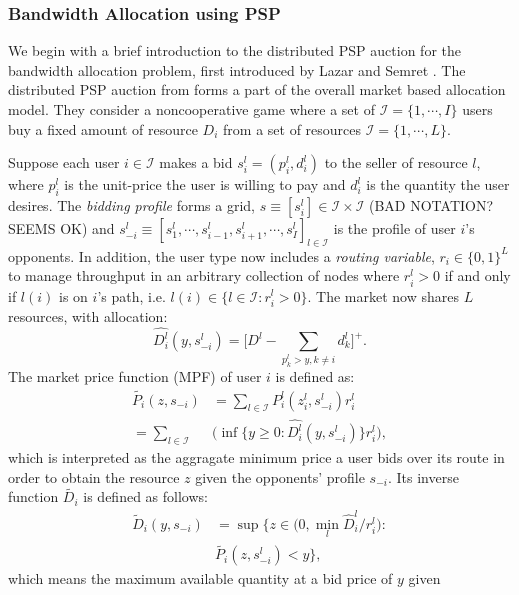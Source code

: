 \documentclass[12pt]{article}
\theoremstyle{definition}
\newcommand{\mcI}{\mathcal{I}}
\begin{document}
\begin{multicols}{2}
\subsubsection{Bandwidth Allocation using PSP}

We begin with a brief introduction to the distributed PSP auction for the
bandwidth allocation problem, first introduced by Lazar and Semret \cite{lazar}.
The distributed PSP auction from \cite{lazar} forms a part of the
overall market based allocation model. They consider a noncooperative game
where a set of $\mcI = \lbrace 1,\cdots,I\rbrace$ users buy a fixed
amount of resource $D_i$ from a set of resources $\mcI = \lbrace 1,\cdots,L\rbrace$. 

Suppose each user $i \in \mcI$ makes a bid $s_i^l = (p_i^l, d_i^l)$ to the
seller of resource $l$,
where $p_i^l$ is the unit-price the user is willing to pay and $d_i^l$ is the
quantity the user desires. The \emph{bidding profile} forms a grid, $s \equiv
[s_i^l] \in \mcI \times \mcI$ (BAD NOTATION?
SEEMS OK)  and $s_{−i}^l \equiv [s_1^l , \cdots , s_{i−1}^l , s_{i+1}^l , \cdots
, s_I^l]_{l\in\mcI}$ is
the profile of user $i$’s opponents. In addition, the user type now includes a
\emph{routing variable}, $r_i\in\lbrace 0, 1\rbrace^L$ to manage throughput in
an arbitrary collection of nodes where $r_i^l >0$ if and only if $l(i)$ is on
$i$'s path, i.e. $l(i) \in \lbrace l\in \mcI : r_i^l >0\rbrace$. 
The market now shares $L$ resources, with allocation:
$$
    \hat{D_i^l}(y,s_{-i}^l) = \bigg\lbrack D^l -
\displaystyle\sum_{p_k^l > y, k\ne i} d_k^l\bigg\rbrack^+.
$$
The market price function (MPF) of user $i$ is defined as:
\begin{align*}
    \tilde{P_i}(z, s_{-i}) &= \displaystyle\sum_{l\in\mcI}P_i^l(z_i^l,
s_{-i}^l)r_i^l \\
    = \displaystyle\sum_{l\in\mcI}&\bigg(\inf\bigg\lbrace y\ge 0 :
\hat{D_i^l}(y,s_{-i}^l)\bigg\rbrace r_i^l\bigg),
\end{align*}
which is interpreted as the aggragate minimum price a user bids over its route in order to obtain the
resource $z$ given the opponents’ profile $s_{−i}$. Its inverse function
$\tilde{D_i}$ is defined as follows:
\begin{align*}
    \tilde{D}_i(y, s_{-i}) &= \sup\bigg\lbrace z\in \bigg( 0,
\min_l\hat{D}_i^l/r_i^l\bigg) : \\
    &\tilde{P_i}(z,s_{-i}^l) < y\bigg\rbrace,
\end{align*}
which means the maximum available quantity at a bid price of $y$ given

\end{multicols}
\end{document}
